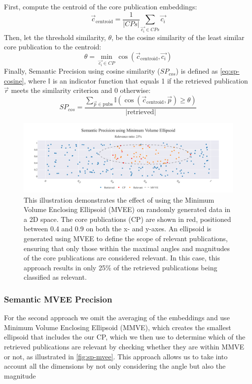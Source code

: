 First, compute the centroid of the core publication embeddings:
\[
\vec{c}_{\text{centroid}} = \frac{1}{|CPs|} \sum_{\vec{c_i} \in CPs} \vec{c_i}
\]
Then, let the threshold similarity, $\theta$, be the cosine similarity of the least similar core publication to the centroid:
\[
\theta = \min_{\vec{c_i} \in CP} \cos(\vec{c}_{\text{centroid}}, \vec{c_i})
\]
Finally, Semantic Precision using cosine similarity ($SP_{cos}$) is defined as \autoref{eq:sp-cosine}, where $\mathbb{I}$ is an indicator function that equals 1 if the retrieved publication $\vec{r}$ meets the similarity criterion and 0 otherwise:
\begin{equation}\label{eq:sp-cosine}
	SP_{cos} = \frac{\sum_{\vec{p} \in \text{pubs}} \mathbb{I} \left( \cos(\vec{c}_{\text{centroid}}, \vec{p}) \geq \theta \right)}{|\text{retrieved}|}
\end{equation}

\begin{figure}[h!]
	\centering	
	\includegraphics[scale=0.4]{pics/sp_mvee.pdf}
	\caption[Semantic Precision using MVEEE]{This illustration demonstrates the effect of using the Minimum Volume Enclosing Ellipsoid (MVEE) on randomly generated data in a 2D space. The core publications (CP) are shown in red, positioned between 0.4 and 0.9 on both the x- and y-axes. An ellipsoid is generated using MVEE to define the scope of relevant publications, ensuring that only those within the maximal angles and magnitudes of the core publications are considered relevant. In this case, this approach results in only 25\% of the retrieved publications being classified as relevant.}

	\label{fig:sp-mvee}
\end{figure}

\subsubsection{Semantic MVEE Precision}
For the second approach we omit the averaging of the embeddings and use Minimum Volume Enclosing Ellipsoid (MMVE), which creates the smallest ellipsoid that includes the our CP, which we then use to determine which of the retrieved publications are relevant by checking whether they are within MMVE or not, as illustrated in \autoref{fig:sp-mvee}. This approach allows us to take into account all the dimensions by not only considering the angle but also the magnitude

